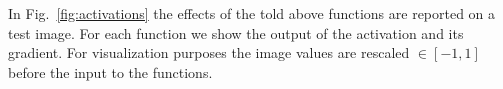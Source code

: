 \documentclass{standalone}
\begin{document}
In Fig.~\ref{fig:activations} the effects of the told above functions are reported on a test image.
For each function we show the output of the activation and its gradient.
For visualization purposes the image values are rescaled $\in[-1, 1]$ before the input to the functions.






\end{document}
